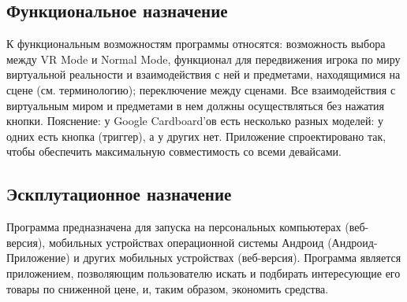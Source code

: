 \subsection{Функциональное назначение}
К функциональным возможностям программы относятся: возможность выбора между VR Mode и Normal Mode, функционал для передвижения игрока по миру виртуальной реальности и взаимодействия с ней и предметами, находящимися на сцене (см. терминологию); переключение между сценами. Все взаимодействия с виртуальным миром и предметами в нем должны осуществляться без нажатия кнопки. Пояснение: у Google Cardboard'ов есть несколько разных моделей: у одних есть кнопка (триггер), а у других нет. Приложение спроектировано так, чтобы обеспечить максимальную совместимость со всеми девайсами. 

\subsection{Эскплутационное назначение}
Программа предназначена для запуска на персональных компьютерах (веб-версия), мобильных устройствах операционной
системы Андроид (Андроид-Приложение) и других мобильных устройствах (веб-версия). Программа является 
приложением, позволяющим пользователю искать и подбирать интересующие его товары по сниженной цене, и, таким образом, экономить
средства. 



